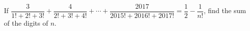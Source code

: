 If $\dfrac3{1!+2!+3!}+\dfrac4{2!+3!+4!}+\cdots+\dfrac{2017}{2015!+2016!+2017!}=\dfrac12-\dfrac1{n!}$, find the sum of the digits of $n$.
